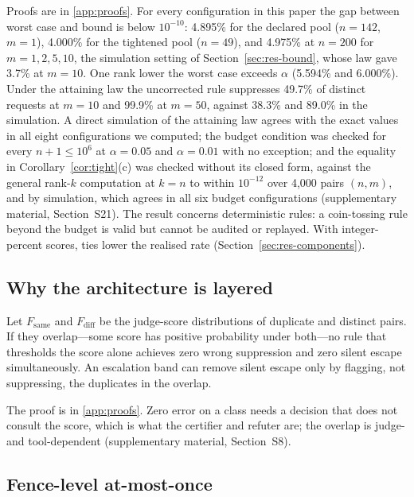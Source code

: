 Proofs are in \ref{app:proofs}. For every configuration in this paper the gap between worst case and bound is below $10^{-10}$: 4.895\% for the declared pool ($n=142$, $m=1$), 4.000\% for the tightened pool ($n=49$), and 4.975\% at $n=200$ for $m=1,2,5,10$, the simulation setting of Section~\ref{sec:res-bound}, whose law gave 3.7\% at $m=10$. One rank lower the worst case exceeds $\alpha$ (5.594\% and 6.000\%). Under the attaining law the uncorrected rule suppresses 49.7\% of distinct requests at $m=10$ and 99.9\% at $m=50$, against 38.3\% and 89.0\% in the simulation. A direct simulation of the attaining law agrees with the exact values in all eight configurations we computed; the budget condition was checked for every $n+1\le10^6$ at $\alpha=0.05$ and $\alpha=0.01$ with no exception; and the equality in Corollary~\ref{cor:tight}(c) was checked without its closed form, against the general rank-$k$ computation at $k=n$ to within $10^{-12}$ over 4,000 pairs $(n,m)$, and by simulation, which agrees in all six budget configurations (supplementary material, Section~S21). The result concerns deterministic rules: a coin-tossing rule beyond the budget is valid but cannot be audited or replayed. With integer-percent scores, ties lower the realised rate (Section~\ref{sec:res-components}).

\subsection{Why the architecture is layered}

\begin{proposition}\label{prop:impossible}
Let $F_{\mathrm{same}}$ and $F_{\mathrm{diff}}$ be the judge-score distributions of duplicate and distinct pairs. If they overlap---some score has positive probability under both---no rule that thresholds the score alone achieves zero wrong suppression and zero silent escape simultaneously. An escalation band can remove silent escape only by flagging, not suppressing, the duplicates in the overlap.
\end{proposition}

The proof is in \ref{app:proofs}. Zero error on a class needs a decision that does not consult the score, which is what the certifier and refuter are; the overlap is judge- and tool-dependent (supplementary material, Section~S8).

\subsection{Fence-level at-most-once}\label{sec:amo}

